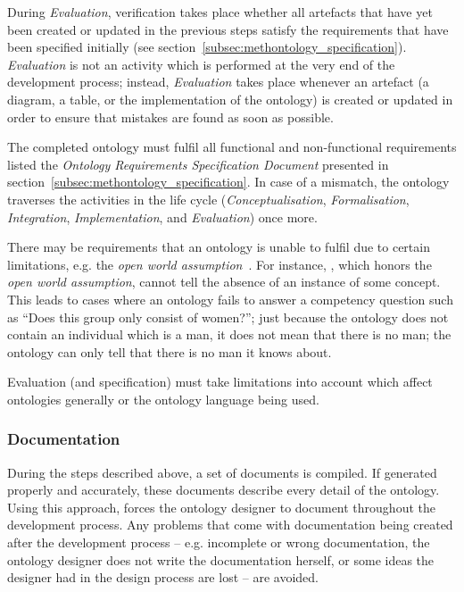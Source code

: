 During \emph{Evaluation}, verification takes place whether all artefacts that have yet been created or updated in the previous steps satisfy the requirements that have been specified initially (see section~\ref{subsec:methontology_specification}). \emph{Evaluation} is not an activity which is performed at the very end of the development process; instead, \emph{Evaluation} takes place whenever an artefact (a diagram, a table, or the implementation of the ontology) is created or updated in order to ensure that mistakes are found as soon as possible.

The completed ontology must fulfil all functional and non-functional requirements listed the \emph{Ontology Requirements Specification Document} presented in section~\ref{subsec:methontology_specification}. In case of a mismatch, the ontology traverses the activities in the life cycle (\emph{Conceptualisation}, \emph{Formalisation}, \emph{Integration}, \emph{Implementation}, and \emph{Evaluation}) once more.

There may be requirements that an ontology is unable to fulfil due to certain limitations, e.g. the \emph{open world assumption}~\cite{open_world_assumption}. For instance, , which honors the \emph{open world assumption}, cannot tell the absence of an instance of some concept. This leads to cases where an ontology fails to answer a competency question such as ``Does this group only consist of women?''; just because the ontology does not contain an individual which is a man, it does not mean that there is no man; the ontology can only tell that there is no man it knows about.

Evaluation (and specification) must take limitations into account which affect ontologies generally or the ontology language being used.

\subsubsection{Documentation}


During the steps described above, a set of documents is compiled. If generated properly and accurately, these documents describe every detail of the ontology. Using this approach, \methontology forces the ontology designer to document throughout the development process. Any problems that come with documentation being created after the development process -- e.g. incomplete or wrong documentation, the ontology designer does not write the documentation herself, or some ideas the designer had in the design process are lost -- are avoided.

